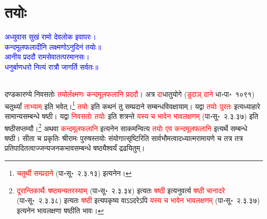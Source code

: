\section[तयोः]{तयोः}
\centering\textcolor{blue}{अध्युवास सुखं रामो देवलोक इवापरः।\nopagebreak\\
कन्दमूलफलादीनि लक्ष्मणोऽनुदिनं तयोः॥\\
आनीय प्रददौ रामसेवातत्परमानसः।\nopagebreak\\
धनुर्बाणधरो नित्यं रात्रौ जागर्ति सर्वतः॥}\nopagebreak\\
\\
\begin{sloppypar}\justifying\noindent\hspace{10mm} दण्डकारण्ये निवसतोः \textcolor{red}{तयोर्लक्ष्मणः कन्द\-मूल\-फलानि प्रददौ}। अत्र \textcolor{red}{दा}\-धातु\-योगे (\textcolor{red}{डुदाञ् दाने} धा॰पा॰~१०९१) चतुर्थ्यां \textcolor{red}{ताभ्याम्‌} इति भवेत्।\footnote{\textcolor{red}{चतुर्थी सम्प्रदाने} (पा॰सू॰~२.३.१३) इत्यनेन।} \textcolor{red}{तयोः} इति कथनं तु सम्प्रदाने सम्बन्ध\-विवक्षायाम्। यद्वा \textcolor{red}{तयोः पुरतः} इत्यध्याहारे सामान्य\-सम्बन्धे षष्ठी। यद्वा \textcolor{red}{निवसतोः तयोः} इति शत्रन्ते \textcolor{red}{यस्य च भावेन भाव\-लक्षणम्‌} (पा॰सू॰~२.३.३७) इति षष्ठीसप्तम्यौ।\footnote{\textcolor{red}{दूरान्तिकार्थैः षष्ठ्यन्यतरस्याम्‌} (पा॰सू॰~२.३.३४) इत्यतः \textcolor{red}{षष्ठी} इत्यनुवर्त्य \textcolor{red}{षष्ठी चानादरे} (पा॰सू॰~२.३.३८) इत्यतः \textcolor{red}{षष्ठी} इत्यपकृष्य वाऽऽदरेऽपि \textcolor{red}{यस्य च भावेन भाव\-लक्षणम्‌} (पा॰सू॰~२.३.३७) इत्यनेन भावलक्षणा षष्ठीति भावः।} अथवा \textcolor{red}{कन्द\-मूल\-फलानि} इत्यनेन साकमन्वित्य \textcolor{red}{तयोः एव कन्द\-मूल\-फलानि} इत्यर्थे सम्बन्धे षष्ठी। सीता च प्रकृतिः श्रीरामः पुरुषस्तयोः संयोगात्सृष्टिरिति सार्वभौमत्वादध्यात्म\-रामायणे च तत्र तत्र प्रतिपादितत्वाज्जन्य\-जनक\-भाव\-सम्बन्धे षष्ठ्यैश्वर्यं द्रढयितुम्।\end{sloppypar}
